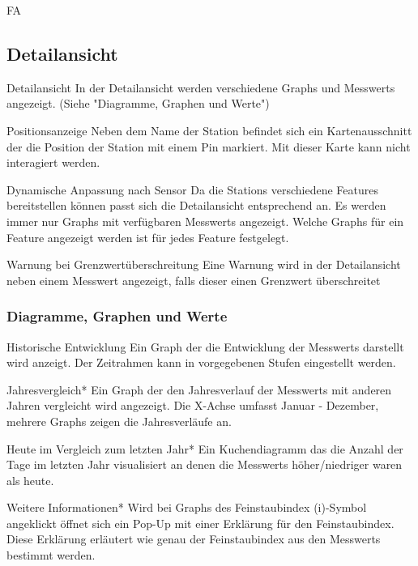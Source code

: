 \begin{Kriterien}{FA}
\subsection{Detailansicht}

 \item[Detailansicht]
   In der Detailansicht werden verschiedene \glspl{Graph} und \glspl{Messwert} angezeigt. 
   (Siehe "Diagramme, Graphen und Werte")
 \item[Positionsanzeige]
  Neben dem Name der \gls{Station} befindet sich ein Kartenausschnitt der die Position der \gls{Station} mit einem \gls{Pin} markiert.
  Mit dieser Karte kann nicht interagiert werden.

 \item[Dynamische Anpassung nach Sensor]
   Da die \glspl{Station} verschiedene \glspl{Feature} bereitstellen können passt sich die Detailansicht entsprechend an.
   Es werden immer nur \glspl{Graph} mit verfügbaren \glspl{Messwert} angezeigt.
   Welche \glspl{Graph} für ein \gls{Feature} angezeigt werden ist für jedes \gls{Feature} festgelegt.

 \item[Warnung bei Grenzwertüberschreitung]
  Eine Warnung wird in der Detailansicht neben einem \gls{Messwert} angezeigt, falls dieser einen Grenzwert überschreitet

 \subsubsection*{Diagramme, Graphen und Werte}

 \item[Historische Entwicklung]
   Ein \gls{Graph} der die Entwicklung der \glspl{Messwert} darstellt wird anzeigt.
   Der Zeitrahmen kann in vorgegebenen Stufen eingestellt werden.

 \item[Jahresvergleich*]
   Ein Graph der den Jahresverlauf der \glspl{Messwert} mit anderen Jahren vergleicht wird angezeigt.
   Die X-Achse umfasst Januar - Dezember, mehrere \glspl{Graph} zeigen die Jahresverläufe an.

 \item[Heute im Vergleich zum letzten Jahr*]
   Ein \gls{Kuchendiagramm} das die Anzahl der Tage im letzten Jahr visualisiert an denen die \glspl{Messwert} höher/niedriger waren als heute.

 \item[Weitere Informationen*]
   Wird bei \glspl{Graph} des \gls{Feinstaubindex} (i)-Symbol angeklickt öffnet sich ein \gls{Pop-Up} mit einer Erklärung für den \gls{Feinstaubindex}.
   Diese Erklärung erläutert wie genau der \gls{Feinstaubindex} aus den \glspl{Messwert} bestimmt werden.


\end{Kriterien}
